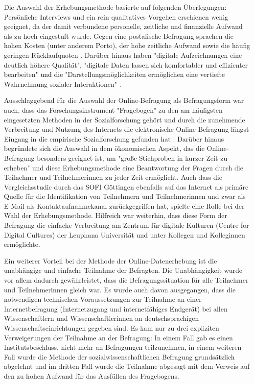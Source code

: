 Die Auswahl der Erhebungsmethode basierte auf folgenden Überlegungen: Persönliche Interviews und ein rein qualitatives Vorgehen erschienen wenig geeignet, da der damit verbundene personelle, zeitliche und finanzielle Aufwand als zu hoch eingestuft wurde. Gegen eine postalische Befragung sprachen die hohen Kosten (unter anderem Porto), der hohe zeitliche Aufwand sowie die häufig geringen Rücklaufquoten \cite{suchen}. Darüber hinaus haben "digitale Aufzeichnungen eine deutlich höhere Qualität", "digitale Daten lassen sich komfortabler und effizienter bearbeiten" und die "Darstellungsmöglichkeiten ermöglichen eine vertiefte Wahrnehmung sozialer Interaktionen" \cite{Hartung_2011_digitalisierung}.

Ausschlaggebend für die Auswahl der Online-Befragung als Befragungsform war auch, dass das Forschungsinstrument "Fragebogen" zu den am häufigsten eingesetzten Methoden in der Sozialforschung gehört \cite{raab_2012_fragebogen} und durch die zunehmende Verbreitung und Nutzung des Internets die elektronische Online-Befragung längst Eingang in die empirische Sozialforschung gefunden hat \cite{Pannewitz_2002}. Darüber hinaus begründete sich die Auswahl in dem ökonomischen Aspekt, das die Online-Befragung besonders geeignet ist, um "große Stichproben in kurzer Zeit zu erheben" \cite{eichhorn_2004_online} und diese Erhebungsmethode eine Beantwortung der Fragen durch die Teilnehmer und Teilnehmerinnen zu jeder Zeit ermöglicht. Auch dass die Vergleichsstudie durch das SOFI Göttingen ebenfalls auf das Internet als primäre Quelle für die Identifikation von Teilnehmern und Teilnehmerinnen und zwar als E-Mail als Kontaktaufnahmekanal zurückgegriffen hat, spielte eine Rolle bei der Wahl der Erhebungsmethode. Hilfreich war weiterhin, dass diese Form der Befragung die einfache Verbreitung am Zentrum für digitale Kulturen (Centre for Digital Cultures) der Leuphana Universität und unter Kollegen und Kolleginnen ermöglichte.

Ein weiterer Vorteil bei der Methode der Online-Datenerhebung ist die unabhängige und einfache Teilnahme der Befragten. Die Unabhängigkeit wurde vor allem dadurch gewährleistet, dass die Befragungssituation für alle Teilnehmer und Teilnehmerinnen gleich war. Es wurde auch davon ausgegangen, dass die notwendigen technischen Voraussetzungen zur Teilnahme an einer Internetbefragung (Internetzugang und internetfähiges Endgerät) bei allen Wissenschaftlern und Wissenschaftlerinnen an deutschsprachigen Wissenschaftseinrichtungen gegeben sind. Es kam nur zu drei expliziten Verweigerungen der Teilnahme an der Befragung: In einem Fall gab es einen Institutsbeschluss, nicht mehr an Befragungen teilzunehmen, in einem weiteren Fall wurde die Methode der sozialwissenschaftlichen Befragung grundsätzlich abgelehnt und im dritten Fall wurde die Teilnahme abgesagt mit dem Verweis auf den zu hohen Aufwand für das Ausfüllen des Fragebogens.

